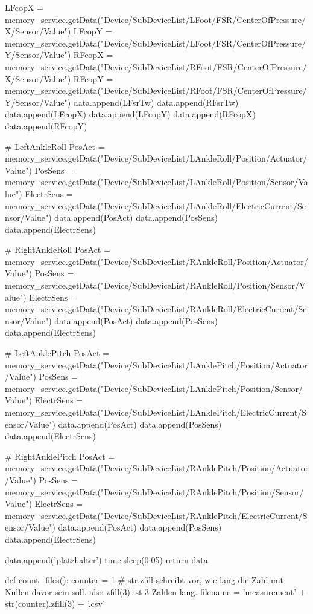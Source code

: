 \begin{python} [caption={Pythonprogramm für Messaufnahmen}, label=Messungscode]
				LFcopX = memory_service.getData("Device/SubDeviceList/LFoot/FSR/CenterOfPressure/X/Sensor/Value")
				LFcopY = memory_service.getData("Device/SubDeviceList/LFoot/FSR/CenterOfPressure/Y/Sensor/Value")
				RFcopX = memory_service.getData("Device/SubDeviceList/RFoot/FSR/CenterOfPressure/X/Sensor/Value")
				RFcopY = memory_service.getData("Device/SubDeviceList/RFoot/FSR/CenterOfPressure/Y/Sensor/Value")
				data.append(LFsrTw)
				data.append(RFsrTw)
				data.append(LFcopX)
				data.append(LFcopY)
				data.append(RFcopX)
				data.append(RFcopY)
				
				# LeftAnkleRoll
				PosAct = memory_service.getData("Device/SubDeviceList/LAnkleRoll/Position/Actuator/Value")
				PosSens = memory_service.getData("Device/SubDeviceList/LAnkleRoll/Position/Sensor/Value")
				ElectrSens = memory_service.getData("Device/SubDeviceList/LAnkleRoll/ElectricCurrent/Sensor/Value")
				data.append(PosAct)
				data.append(PosSens)
				data.append(ElectrSens)
				
				# RightAnkleRoll
				PosAct = memory_service.getData("Device/SubDeviceList/RAnkleRoll/Position/Actuator/Value")
				PosSens = memory_service.getData("Device/SubDeviceList/RAnkleRoll/Position/Sensor/Value")
				ElectrSens = memory_service.getData("Device/SubDeviceList/RAnkleRoll/ElectricCurrent/Sensor/Value")
				data.append(PosAct)
				data.append(PosSens)
				data.append(ElectrSens)
				
				# LeftAnklePitch
				PosAct = memory_service.getData("Device/SubDeviceList/LAnklePitch/Position/Actuator/Value")
				PosSens = memory_service.getData("Device/SubDeviceList/LAnklePitch/Position/Sensor/Value")
				ElectrSens = memory_service.getData("Device/SubDeviceList/LAnklePitch/ElectricCurrent/Sensor/Value")
				data.append(PosAct)
				data.append(PosSens)
				data.append(ElectrSens)
				
				# RightAnklePitch
				PosAct = memory_service.getData("Device/SubDeviceList/RAnklePitch/Position/Actuator/Value")
				PosSens = memory_service.getData("Device/SubDeviceList/RAnklePitch/Position/Sensor/Value")
				ElectrSens = memory_service.getData("Device/SubDeviceList/RAnklePitch/ElectricCurrent/Sensor/Value")
				data.append(PosAct)
				data.append(PosSens)
				data.append(ElectrSens)
				
				data.append('platzhalter')
				time.sleep(0.05)
			return data
		
		
		def count_files():
			counter = 1
			# str.zfill schreibt vor, wie lang die Zahl mit Nullen davor sein soll. also zfill(3) ist 3 Zahlen lang.
			filename = 'measurement' + str(counter).zfill(3) + '.csv'
			

\end{python}
